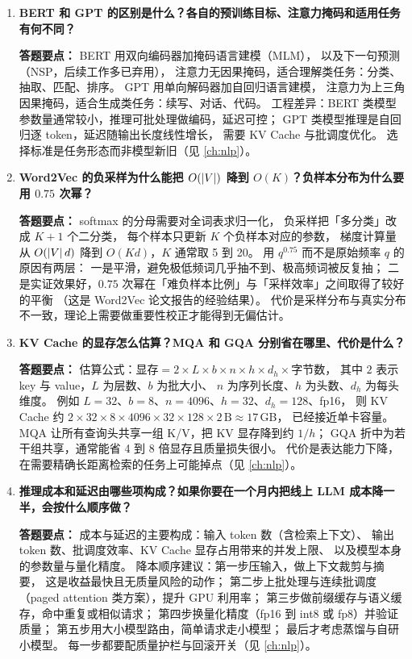 \begin{interview}[题库与答题要点]
\begin{enumerate}[label=]
  \item[\textcolor{VioletDeep}{\textbf{Q53.}}] \textbf{BERT 和 GPT 的区别是什么？各自的预训练目标、注意力掩码和适用任务有何不同？}
\par\smallskip\noindent\textcolor{VioletDeep}{\textbf{答题要点：}}
BERT 用双向编码器加掩码语言建模（MLM），
以及下一句预测（NSP，后续工作多已弃用），
注意力无因果掩码，适合理解类任务：分类、抽取、匹配、排序。
GPT 用单向解码器加自回归语言建模，
注意力为上三角因果掩码，适合生成类任务：续写、对话、代码。
工程差异：BERT 类模型参数量通常较小，推理可批处理做编码，延迟可控；
GPT 类模型推理是自回归逐 token，延迟随输出长度线性增长，
需要 KV Cache 与批调度优化。
选择标准是任务形态而非模型新旧（见 \cref{ch:nlp}）。

  \item[\textcolor{VioletDeep}{\textbf{Q54.}}] \textbf{Word2Vec 的负采样为什么能把 $O(\left\lvert V \right\rvert)$ 降到 $O(K)$？负样本分布为什么要用 $0.75$ 次幂？}
\par\smallskip\noindent\textcolor{VioletDeep}{\textbf{答题要点：}}
softmax 的分母需要对全词表求归一化，
负采样把「多分类」改成 $K+1$ 个二分类，
每个样本只更新 $K$ 个负样本对应的参数，
梯度计算量从 $O(\left\lvert V \right\rvert d)$ 降到 $O(Kd)$，$K$ 通常取 5 到 20。
用 $q^{0.75}$ 而不是原始频率 $q$ 的原因有两层：
一是平滑，避免极低频词几乎抽不到、极高频词被反复抽；
二是实证效果好，$0.75$ 次幂在「难负样本比例」与「采样效率」之间取得了较好的平衡
（这是 Word2Vec 论文报告的经验结果）。
代价是采样分布与真实分布不一致，理论上需要做重要性校正才能得到无偏估计。

  \item[\textcolor{VioletDeep}{\textbf{Q55.}}] \textbf{KV Cache 的显存怎么估算？MQA 和 GQA 分别省在哪里、代价是什么？}
\par\smallskip\noindent\textcolor{VioletDeep}{\textbf{答题要点：}}
估算公式：$\text{显存} = 2 \times L \times b \times n \times h \times d_h \times \text{字节数}$，
其中 $2$ 表示 key 与 value，$L$ 为层数、$b$ 为批大小、
$n$ 为序列长度、$h$ 为头数、$d_h$ 为每头维度。
例如 $L=32$、$b=8$、$n=4096$、$h=32$、$d_h=128$、fp16，
则 KV Cache 约 $2\times 32\times 8\times 4096\times 32\times 128\times 2\,\text{B} \approx 17$\,GB，
已经接近单卡容量。
MQA 让所有查询头共享一组 K/V，把 KV 显存降到约 $1/h$；
GQA 折中为若干组共享，通常能省 4 到 8 倍显存且质量损失很小。
代价是表达能力下降，在需要精确长距离检索的任务上可能掉点（见 \cref{ch:nlp}）。

  \item[\textcolor{VioletDeep}{\textbf{Q56.}}] \textbf{推理成本和延迟由哪些项构成？如果你要在一个月内把线上 LLM 成本降一半，会按什么顺序做？}
\par\smallskip\noindent\textcolor{VioletDeep}{\textbf{答题要点：}}
成本与延迟的主要构成：输入 token 数（含检索上下文）、
输出 token 数、批调度效率、KV Cache 显存占用带来的并发上限、
以及模型本身的参数量与量化精度。
降本顺序建议：第一步压输入，做上下文裁剪与摘要，
这是收益最快且无质量风险的动作；
第二步上批处理与连续批调度（paged attention 类方案），提升 GPU 利用率；
第三步做前缀缓存与语义缓存，命中重复或相似请求；
第四步换量化精度（fp16 到 int8 或 fp8）并验证质量；
第五步用大小模型路由，简单请求走小模型；
最后才考虑蒸馏与自研小模型。
每一步都要配质量护栏与回滚开关（见 \cref{ch:nlp}）。


\end{enumerate}
\end{interview}
